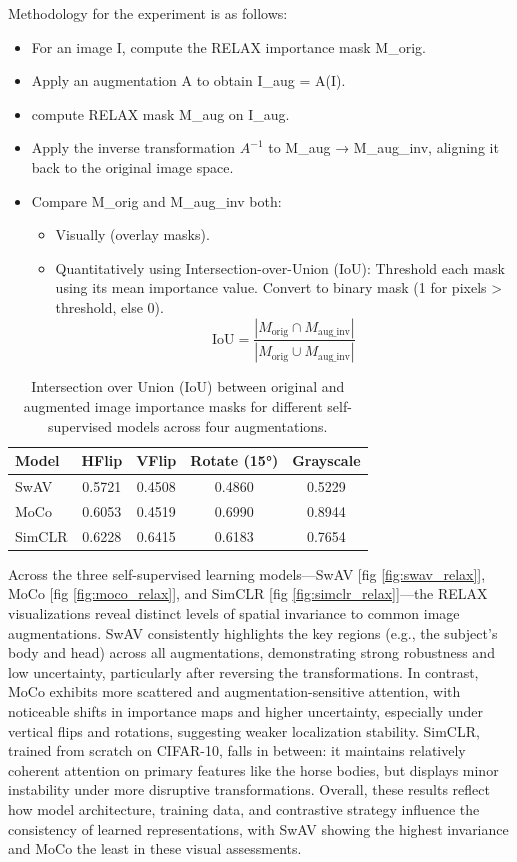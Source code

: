 Methodology for the experiment is as follows:
\begin{itemize}
\item For an image I, compute the RELAX importance mask M\_orig.
\item Apply an augmentation A to obtain I\_aug = A(I).
\item compute RELAX mask M\_aug on I\_aug.
\item Apply the inverse transformation $A^{-1}$ to M\_aug → M\_aug\_inv, aligning it back to the original image space.
\item Compare M\_orig and M\_aug\_inv both:
\begin{itemize}
    \item Visually (overlay masks).
    \item Quantitatively using Intersection-over-Union (IoU):
Threshold each mask using its mean importance value.
Convert to binary mask (1 for pixels > threshold, else 0).
\[
\text{IoU} = \frac{|M_{\text{orig}} \cap M_{\text{aug\_inv}}|}{|M_{\text{orig}} \cup M_{\text{aug\_inv}}|}
\]
\end{itemize}
\end{itemize}

\begin{table}[htbp]
\centering
\caption{Intersection over Union (IoU) between original and augmented image importance masks for different self-supervised models across four augmentations.}
\label{tab:iou_results}
\begin{tabular}{lcccc}
\toprule
\textbf{Model} & \textbf{HFlip} & \textbf{VFlip} & \textbf{Rotate (15°)} & \textbf{Grayscale} \\
\midrule
SwAV & 0.5721 & 0.4508 & 0.4860 & 0.5229 \\
MoCo & 0.6053 & 0.4519 & 0.6990 & 0.8944 \\
SimCLR & 0.6228 & 0.6415 & 0.6183 & 0.7654 \\
\bottomrule
\end{tabular}
\end{table}

Across the three self-supervised learning models—SwAV [fig \ref{fig:swav_relax}], MoCo [fig \ref{fig:moco_relax}], and SimCLR [fig \ref{fig:simclr_relax}]—the RELAX visualizations reveal distinct levels of spatial invariance to common image augmentations. SwAV consistently highlights the key regions (e.g., the subject’s body and head) across all augmentations, demonstrating strong robustness and low uncertainty, particularly after reversing the transformations. In contrast, MoCo exhibits more scattered and augmentation-sensitive attention, with noticeable shifts in importance maps and higher uncertainty, especially under vertical flips and rotations, suggesting weaker localization stability. SimCLR, trained from scratch on CIFAR-10, falls in between: it maintains relatively coherent attention on primary features like the horse bodies, but displays minor instability under more disruptive transformations. Overall, these results reflect how model architecture, training data, and contrastive strategy influence the consistency of learned representations, with SwAV showing the highest invariance and MoCo the least in these visual assessments.

